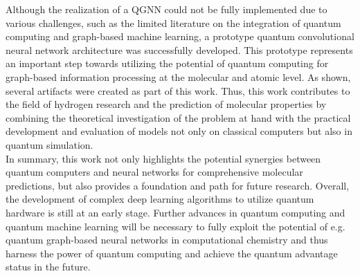 Although the realization of a QGNN could not be fully implemented due to various challenges, such as the limited literature on the integration of quantum computing and graph-based machine learning, a prototype quantum convolutional neural network architecture was successfully developed. This prototype represents an important step towards utilizing the potential of quantum computing for graph-based information processing at the molecular and atomic level. As shown, several artifacts were created as part of this work. Thus, this work contributes to the field of hydrogen research and the prediction of molecular properties by combining the theoretical investigation of the problem at hand with the practical development and evaluation of models not only on classical computers but also in quantum simulation. \\

In summary, this work not only highlights the potential synergies between quantum computers and neural networks for comprehensive molecular predictions, but also provides a foundation and path for future research. Overall, the development of complex deep learning algorithms to utilize quantum hardware is still at an early stage. Further advances in quantum computing and quantum machine learning will be necessary to fully exploit the potential of e.g. quantum graph-based neural networks in computational chemistry and thus harness the power of quantum computing and achieve the quantum advantage status in the future. 




